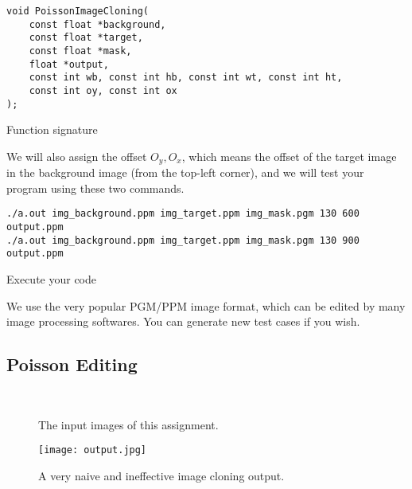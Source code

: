 \documentclass[12pt,a4paper]{article}
\begin{document}
\begin{listing}[ht]
\begin{verbatim}
void PoissonImageCloning(
    const float *background,
    const float *target,
    const float *mask,
    float *output,
    const int wb, const int hb, const int wt, const int ht,
    const int oy, const int ox
);
\end{verbatim}
\caption{Function signature}\label{lst:sig}
\end{listing}

We will also assign the offset $O_y, O_x$,
which means the offset of the target image
in the background image (from the top-left corner),
and we will test your program using these two commands.

\begin{listing}[ht]
\begin{verbatim}
./a.out img_background.ppm img_target.ppm img_mask.pgm 130 600 output.ppm
./a.out img_background.ppm img_target.ppm img_mask.pgm 130 900 output.ppm
\end{verbatim}
\caption{Execute your code}\label{lst:exe}
\end{listing}

We use the very popular PGM/PPM image format,
which can be edited by many image processing softwares.
You can generate new test cases if you wish.

\subsection{Poisson Editing}

\begin{figure}
\centering
{}\\
\caption{The input images of this assignment.}\label{fig:img_clone}
\end{figure}

\begin{figure}
\centering
\texttt{[image: output.jpg]}
\caption{A very naive and ineffective image cloning output.}\label{fig:img_clone_example}
\end{figure}
\end{document}
